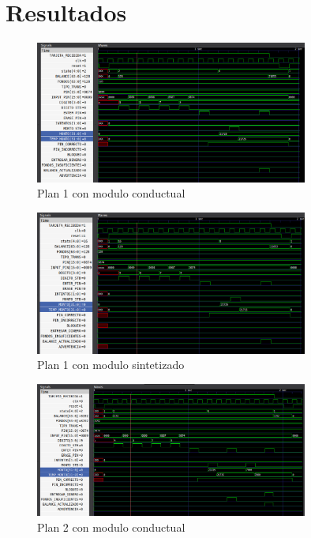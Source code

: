 \newpage
\section{Resultados}

\begin{figure}[H]\label{fig:A1}
    \centering
    \includegraphics[width=0.8\textwidth]{imagenes/A1.png}
    \caption{Plan 1 con modulo conductual}
\end{figure}

\begin{figure}[H]\label{fig:B1}
    \centering
    \includegraphics[width=0.8\textwidth]{imagenes/B1.png}
    \caption{Plan 1 con modulo sintetizado}
\end{figure}

\begin{figure}[H]\label{fig:A2}
    \centering
    \includegraphics[width=0.8\textwidth]{imagenes/A2.png}
    \caption{Plan 2 con modulo conductual}
\end{figure}

